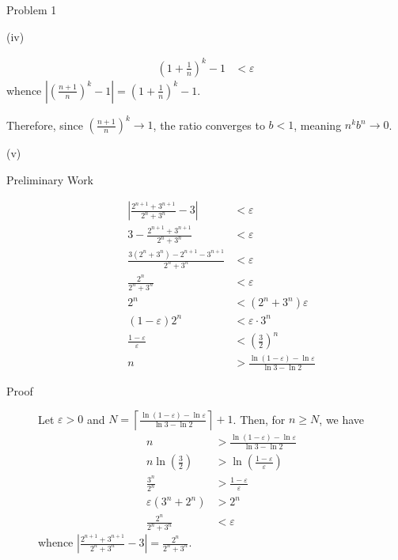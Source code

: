 \documentclass[10pt]{extarticle}
\begin{document}
\begin{problem}{Problem 1}
\begin{problem}{(iv)}
\begin{description}
\begin{align*}
            \left(1 + \frac{1}{n}\right)^{k} - 1 &< \varepsilon
          \end{align*}
          whence $\displaystyle\left|\left(\frac{n+1}{n}\right)^{k} - 1\right| = \left(1 + \frac{1}{n}\right)^{k} - 1$. 
      \end{description}
      Therefore, since $\displaystyle \left(\frac{n+1}{n}\right)^k \rightarrow 1$, the ratio converges to $b < 1$, meaning $n^kb^n \rightarrow 0$.
    \end{problem}
    \begin{problem}{(v)}
      \begin{description}
        \item[Preliminary Work]
          \begin{align*}
            \left|\frac{2^{n+1} + 3^{n+1}}{2^n + 3^n} - 3 \right| &< \varepsilon\\
            3 - \frac{2^{n+1} + 3^{n+1}}{2^n + 3^n} &< \varepsilon\\
            \frac{3(2^n + 3^n) - 2^{n+1} - 3^{n+1}}{2^n + 3^n} &< \varepsilon\\
            \frac{2^n}{2^n + 3^n} &< \varepsilon\\
            2^n &< (2^n + 3^n)\varepsilon\\
            (1-\varepsilon)2^n &< \varepsilon \cdot 3^n\\
            \frac{1-\varepsilon}{\varepsilon} &< \left(\frac{3}{2}\right)^n\\
            n &> \frac{\ln(1-\varepsilon) - \ln\varepsilon}{\ln 3 - \ln 2}
          \end{align*}
        \item[Proof] Let $\varepsilon > 0$ and $\displaystyle N = \left\lceil \frac{\ln(1-\varepsilon) - \ln\varepsilon}{\ln 3 - \ln 2}\right\rceil + 1$. Then, for $n\geq N$, we have
          \begin{align*}
            n &> \frac{\ln(1-\varepsilon) - \ln\varepsilon}{\ln 3 - \ln 2}\\
            n\ln \left(\frac{3}{2}\right) &> \ln \left(\frac{1-\varepsilon}{\varepsilon}\right)\\
            \frac{3^n}{2^n} &> \frac{1-\varepsilon}{\varepsilon}\\
            \varepsilon (3^n + 2^n) &> 2^n\\
            \frac{2^n}{2^n + 3^n} &< \varepsilon
          \end{align*}
          whence $\displaystyle\left|\frac{2^{n+1} + 3^{n+1}}{2^n + 3^n} - 3\right| = \frac{2^n}{2^n + 3^n}$.
      \end{description}
    \end{problem}
  \end{problem}
\end{document}
